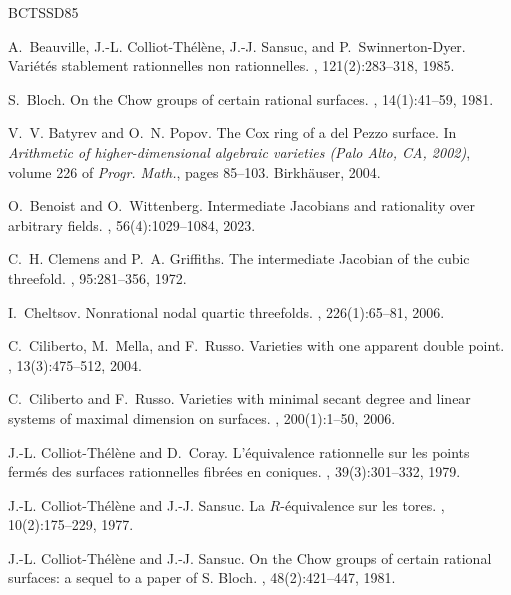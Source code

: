 \documentclass[12pt, reqno]{amsart}
\theoremstyle{plain}
\theoremstyle{remark}
\theoremstyle{definition}
\numberwithin{equation}{section}
\begin{document}
\begin{thebibliography}{BCTSSD85}

A.~Beauville, J.-L. Colliot-Th\'el\`ene, J.-J. Sansuc, and P.~Swinnerton-Dyer.
\newblock Vari\'et\'es stablement rationnelles non rationnelles.
, 121(2):283--318, 1985.

S.~Bloch.
\newblock On the {C}how groups of certain rational surfaces.
, 14(1):41--59, 1981.

V.~V. Batyrev and O.~N. Popov.
\newblock The {C}ox ring of a del {P}ezzo surface.
\newblock In {\em Arithmetic of higher-dimensional algebraic varieties ({P}alo
  {A}lto, {CA}, 2002)}, volume 226 of {\em Progr. Math.}, pages 85--103.
  Birkh\"auser, 2004.

O.~Benoist and O.~Wittenberg.
\newblock Intermediate {J}acobians and rationality over arbitrary fields.
, 56(4):1029--1084, 2023.

C.~H. Clemens and P.~A. Griffiths.
\newblock The intermediate {J}acobian of the cubic threefold.
, 95:281--356, 1972.

I.~Cheltsov.
\newblock Nonrational nodal quartic threefolds.
, 226(1):65--81, 2006.

C.~Ciliberto, M.~Mella, and F.~Russo.
\newblock Varieties with one apparent double point.
, 13(3):475--512, 2004.

C.~Ciliberto and F.~Russo.
\newblock Varieties with minimal secant degree and linear systems of maximal
  dimension on surfaces.
, 200(1):1--50, 2006.

J.-L. Colliot-Th\'el\`ene and D.~Coray.
\newblock L'\'equivalence rationnelle sur les points ferm\'es des surfaces
  rationnelles fibr\'ees en coniques.
, 39(3):301--332, 1979.

J.-L. Colliot-Th\'el\`ene and J.-J. Sansuc.
\newblock La {$R$}-\'equivalence sur les tores.
, 10(2):175--229, 1977.

J.-L. Colliot-Th\'el\`ene and J.-J. Sansuc.
\newblock On the {C}how groups of certain rational surfaces: a sequel to a
  paper of {S}. {B}loch.
, 48(2):421--447, 1981.


\end{thebibliography}
\end{document}
